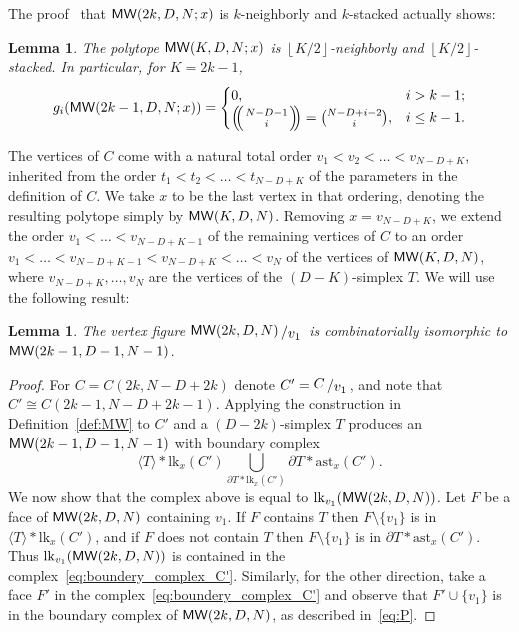 \documentclass[a4paper,leqno]{article}
\newtheorem{lemma}[theorem]{Lemma}
\theoremstyle{definition}
\newcommand{\lk}{\mathrm{lk}}
\newcommand{\anst}{\mathrm{ast}}
\newcommand{\dhalf}[1]{\left\lfloor #1/2\right\rfloor}
\newcommand{\mw}{{\sf MW}}
\def\mchoose#1#2{\ensuremath{\left(\kern-.3em\left(\genfrac{}{}{0pt}{}{#1}{#2}\right)\kern-.3em\right)}}
\newcommand{\vfig}[2]{{\raisebox{.1em}{$#1$}\left/\raisebox{-.1em}{$#2$}\right.}}
\begin{document}
The proof~\cite[p.~269]{McMuW71} that $\mw(2k,D,N;x)$ is $k$-neighborly and $k$-stacked actually shows:

\begin{lemma}\label{lem:gMW}
The polytope $\mw(K,D,N;x)$ is $\dhalf{K}$-neighborly and $\dhalf{K}$-stacked. In particular, for $K = 2k-1$,
\begin{equation}
g_i(\mw(2k-1,D,N;x))=\begin{cases}
0, & i> k-1;\\
\mchoose{N-D-1}{i}=\binom{N-D+i-2}{i}, & i\leq k-1.
\end{cases}
\end{equation}
\end{lemma}

The vertices of $C$ come with a natural total order $v_1<v_2<\dots <v_{N-D+K}$, inherited from the order $t_1 < t_2 <\dots < t_{N-D+K}$ of the parameters in the definition of $C$. We take $x$ to be the last vertex in that ordering,
denoting the resulting polytope simply by $\mw(K,D,N)$.
Removing $x=v_{N-D+K}$, we extend the order $v_1<\dots<v_{N-D+K-1}$ of the remaining vertices of $C$  to an order $v_1<\dots<v_{N-D+K-1}<v_{N-D+K}<\dots<v_N$ of the vertices of $\mw(K,D,N)$, where $v_{N-D+K},\dots,v_N$ are the vertices of the $(D-K)$-simplex $T$.
We will use the following result:

\begin{lemma}\label{lem:vlink_of_MW}
The vertex figure $\vfig{\mw(2k,D,N)}{v_1}$ is combinatorially isomorphic to $\mw(2k-1,D-1,N-1)$.
\end{lemma}
\begin{proof}
For $C=C(2k,N-D+2k)$ denote $C'=\vfig{C}{v_1}$, and note that $C'\cong C(2k-1,N-D+2k-1)$. Applying the construction in Definition~\ref{def:MW} to $C'$ and a $(D-2k)$-simplex $T$ produces an $\mw(2k-1,D-1,N-1)$ with boundary complex
\begin{equation}\label{eq:boundery_complex_C'}
\langle T\rangle \ast \lk_x(C')\bigcup_{\partial T\ast \lk_x(C')}\partial T\ast \anst_x(C').
\end{equation}
We now show that the complex above is equal to $\lk_{v_1}(\mw(2k,D,N))$.
Let $F$ be a face of $\mw(2k,D,N)$ containing $v_1$.
If $F$ contains $T$ then $F\setminus\{v_1\}$ is in $\langle T\rangle \ast \lk_x(C')$,
and if $F$ does not contain $T$ then $F\setminus\{v_1\}$ is in $\partial T\ast \anst_x(C')$. Thus $\lk_{v_1}(\mw(2k,D,N))$ is contained in the complex~\eqref{eq:boundery_complex_C'}.
Similarly, for the other direction, take a face $F'$ in the complex~\eqref{eq:boundery_complex_C'} and observe that $F'\cup\{v_1\}$ is in the boundary complex of $\mw(2k,D,N)$, as described in~\eqref{eq:P}.
\end{proof}
\end{document}
